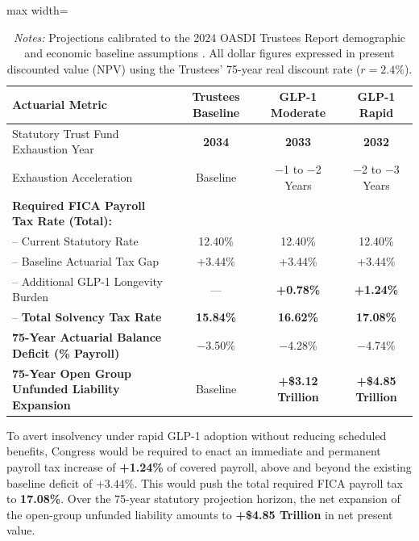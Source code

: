 \documentclass[11pt,a4paper]{article}
\begin{document}
\begin{table}[htbp]
\centering
\caption{\textbf{OASDI Solvency Projections and Long-Term Actuarial Deficits}}
\label{tab:actuarial}
\small
\begin{adjustbox}{max width=\textwidth}
\begin{tabular}{lccc}
\toprule
\textbf{Actuarial Metric} & \textbf{Trustees Baseline} & \textbf{GLP-1 Moderate} & \textbf{GLP-1 Rapid} \\
\midrule
Statutory Trust Fund Exhaustion Year & \textbf{2034} & \textbf{2033} & \textbf{2032} \\
Exhaustion Acceleration & Baseline & $-$1 to $-$2 Years & $-$2 to $-$3 Years \\
\addlinespace
\textbf{Required FICA Payroll Tax Rate (Total):} & & & \\
-- Current Statutory Rate & 12.40\% & 12.40\% & 12.40\% \\
-- Baseline Actuarial Tax Gap & +3.44\% & +3.44\% & +3.44\% \\
-- Additional GLP-1 Longevity Burden & --- & \textbf{+0.78\%} & \textbf{+1.24\%} \\
-- \textbf{Total Solvency Tax Rate} & \textbf{15.84\%} & \textbf{16.62\%} & \textbf{17.08\%} \\
\addlinespace
\textbf{75-Year Actuarial Balance Deficit (\% Payroll)} & $-$3.50\% & $-$4.28\% & $-$4.74\% \\
\textbf{75-Year Open Group Unfunded Liability Expansion} & Baseline & \textbf{+\$3.12 Trillion} & \textbf{+\$4.85 Trillion} \\
\bottomrule
\end{tabular}
\end{adjustbox}
\vspace{0.3em}
\caption*{\footnotesize \textit{Notes:} Projections calibrated to the 2024 OASDI Trustees Report demographic and economic baseline assumptions \citep{ssa2024trustees,cbo2024budget}. All dollar figures expressed in present discounted value (NPV) using the Trustees' 75-year real discount rate ($r = 2.4\%$).}
\end{table}

To avert insolvency under rapid GLP-1 adoption without reducing scheduled benefits, Congress would be required to enact an immediate and permanent payroll tax increase of \textbf{+1.24\%} of covered payroll, above and beyond the existing baseline deficit of $+3.44\%$. This would push the total required FICA payroll tax to \textbf{17.08\%}. Over the 75-year statutory projection horizon, the net expansion of the open-group unfunded liability amounts to \textbf{+\$4.85 Trillion} in net present value.
\end{document}
